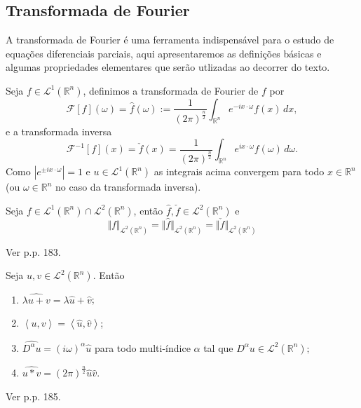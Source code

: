 \documentclass[a4paper, 11pt]{book}
\theoremstyle{definition}
\newcommand{\bR}{\mathbb{R}}
\newcommand{\cF}{\mathcal{F}}
\newcommand{\cL}{\mathcal{L}}
\begin{document}
\subsection{Transformada de Fourier}

A transformada de Fourier é uma ferramenta indispensável para o estudo de equações diferenciais parciais, aqui apresentaremos as definições básicas e algumas propriedades elementares que serão utlizadas ao decorrer do texto.

\begin{dbox}
    Seja $f \in \cL^1(\bR^n)$, definimos a transformada de Fourier de $f$ por
    \[
        \cF[f](\omega) = \hat f(\omega) := \frac{1}{(2\pi)^{\frac{n}{2}}} \int_{\bR^n} e^{-i x \cdot \omega} f(x) \,dx,
    \]
    e a transformada inversa
    \[
        \cF^{-1}[f](x) =  \check f(x) = \frac{1}{(2\pi)^{\frac{n}{2}}} \int_{\bR^n} e^{i x \cdot \omega} f(\omega) \,d\omega.
    \]
    Como $|e^{\pm ix \cdot \omega}| = 1$ e $u \in \cL^1(\bR^n)$ as integrais acima convergem para todo $x \in \bR^n$ (ou $\omega \in \bR^n$ no caso da transformada inversa).
\end{dbox}

\begin{tbox} \label{thm:norma-transformada}
    Seja $f \in \cL^1(\bR^n) \cap \cL^2(\bR^n)$, então $\hat f, \check f \in \cL^2(\bR^n)$ e
    \[
        \Vert f \Vert_{\cL^2(\bR^n)} = \Vert \hat f \Vert_{\cL^2(\bR^n)} = \Vert \check f \Vert_{\cL^2(\bR^n)}
    \]
\end{tbox}
\begin{prf}
    Ver \cite{evans-pde} p.p. 183.
\end{prf}

\begin{tbox} \label{thm:propriedades-transformada}
    Seja $u, v \in \cL^2(\bR^n)$. Então
    \begin{enumerate}[leftmargin=*, label=\textbf{(\alph*)}]
        \item $\widehat{\lambda u + v} = \lambda \hat u + \hat v$;
        \item $\left\langle u, v\right\rangle = \left\langle \hat u, \hat v\right\rangle$;
        \item $\widehat{D^\alpha u} = (i\omega)^\alpha \hat u$ para todo multi-índice $\alpha$ tal que $D^\alpha u \in \cL^2(\bR^n);$\footnotemark
        \item $\widehat{u * v} = (2\pi)^{\frac{n}{2}} \hat u \hat v$.
    \end{enumerate}
\end{tbox}
\begin{prf}
    Ver \cite{evans-pde} p.p. 185.
\end{prf}
\end{document}
